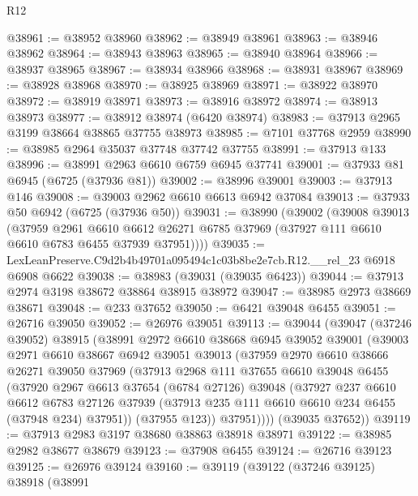 \begin{lexlean}{R12}
\begin{coremodule}
@38961 := @38952 @38960
@38962 := @38949 @38961
@38963 := @38946 @38962
@38964 := @38943 @38963
@38965 := @38940 @38964
@38966 := @38937 @38965
@38967 := @38934 @38966
@38968 := @38931 @38967
@38969 := @38928 @38968
@38970 := @38925 @38969
@38971 := @38922 @38970
@38972 := @38919 @38971
@38973 := @38916 @38972
@38974 := @38913 @38973
@38977 := @38912 @38974 (@6420 @38974)
@38983 := @37913 @2965 @3199 @38664 @38865 @37755 @38973
@38985 := @7101 @37768 @2959
@38990 := @38985 @2964 @35037 @37748 @37742 @37755
@38991 := @37913 @133
@38996 := @38991 @2963 @6610 @6759 @6945 @37741
@39001 := @37933 @81 @6945 (@6725 (@37936 @81))
@39002 := @38996 @39001
@39003 := @37913 @146
@39008 := @39003 @2962 @6610 @6613 @6942 @37084
@39013 := @37933 @50 @6942 (@6725 (@37936 @50))
@39031 := @38990
    (@39002
      (@39008
        @39013
        (@37959
          @2961
          @6610
          @6612
          @26271
          @6785
          @37969
          (@37927 @111 @6610 @6610 @6783 @6455 @37939 @37951))))
@39035 := LexLeanPreserve.C9d2b4b49701a095494c1c03b8be2e7cb.R12.__rel_23 @6918 @6908 @6622
@39038 := @38983 (@39031 (@39035 @6423))
@39044 := @37913 @2974 @3198 @38672 @38864 @38915 @38972
@39047 := @38985 @2973 @38669 @38671
@39048 := @233 @37652
@39050 := @6421 @39048 @6455
@39051 := @26716 @39050
@39052 := @26976 @39051
@39113 := @39044
    (@39047
      (@37246 @39052)
      @38915
      (@38991
        @2972
        @6610
        @38668
        @6945
        @39052
        @39001
        (@39003
          @2971
          @6610
          @38667
          @6942
          @39051
          @39013
          (@37959
            @2970
            @6610
            @38666
            @26271
            @39050
            @37969
            (@37913
              @2968
              @111
              @37655
              @6610
              @39048
              @6455
              (@37920
                @2967
                @6613
                @37654
                (@6784 @27126)
                @39048
                (@37927
                  @237
                  @6610
                  @6612
                  @6783
                  @27126
                  @37939
                  (@37913 @235 @111 @6610 @6610 @234 @6455 (@37948 @234) @37951))
                (@37955 @123))
              @37951))))
      (@39035 @37652))
@39119 := @37913 @2983 @3197 @38680 @38863 @38918 @38971
@39122 := @38985 @2982 @38677 @38679
@39123 := @37908 @6455
@39124 := @26716 @39123
@39125 := @26976 @39124
@39160 := @39119
    (@39122
      (@37246 @39125)
      @38918
      (@38991

\end{coremodule}
\end{lexlean}
